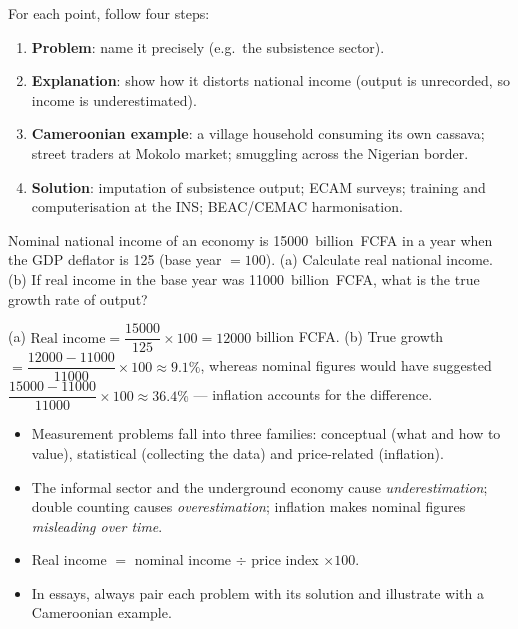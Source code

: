 \documentclass[11pt]{article}
\newcommand{\cle}[1]{{\popxbold\color{popdark}#1}}
\begin{document}
\begin{methode}
For each point, follow four steps:
\begin{enumerate}
\item \textbf{Problem}: name it precisely (e.g.\ the subsistence sector).
\item \textbf{Explanation}: show how it distorts national income (output is unrecorded, so income is underestimated).
\item \textbf{Cameroonian example}: a village household consuming its own cassava; street traders at Mokolo market; smuggling across the Nigerian border.
\item \textbf{Solution}: imputation of subsistence output; ECAM surveys; training and computerisation at the INS; BEAC/CEMAC harmonisation.
\end{enumerate}
\end{methode}

\begin{exercice}
Nominal national income of an economy is \SI{15000}{billion FCFA} in a year when the GDP deflator is 125 (base year $=100$). (a) Calculate real national income. (b) If real income in the base year was \SI{11000}{billion FCFA}, what is the true growth rate of output?
\end{exercice}

\begin{corrige}[Exercise 1]
(a) $\text{Real income} = \dfrac{15000}{125}\times 100 = 12000$ billion FCFA. \quad (b) True growth $= \dfrac{12000-11000}{11000}\times 100 \approx 9.1\%$, whereas nominal figures would have suggested $\dfrac{15000-11000}{11000}\times 100 \approx 36.4\%$ --- inflation accounts for the difference.
\end{corrige}

\begin{aretenir}
\begin{itemize}
\item Measurement problems fall into three families: \cle{conceptual} (what and how to value), \cle{statistical} (collecting the data) and \cle{price-related} (inflation).
\item The informal sector and the underground economy cause \emph{underestimation}; double counting causes \emph{overestimation}; inflation makes nominal figures \emph{misleading over time}.
\item Real income $=$ nominal income $\div$ price index $\times 100$.
\item In essays, always pair each problem with its solution and illustrate with a Cameroonian example.
\end{itemize}
\end{aretenir}
\end{document}
